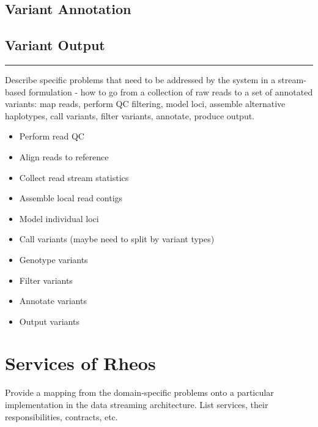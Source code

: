\subsection{Variant Annotation}

\subsection{Variant Output}

\hrule
Describe specific problems that need to be addressed by the system in a stream-based formulation - how to go from a collection of raw reads to a set of annotated variants: map reads, perform QC filtering, model loci, assemble alternative haplotypes, call variants, filter variants, annotate, produce output.  


\begin{itemize}
    \item Perform read QC
    \item Align reads to reference
    \item Collect read stream statistics
    \item Assemble local read contigs
    \item Model individual loci
    \item Call variants (maybe need to split by variant types)
    \item Genotype variants
    \item Filter variants
    \item Annotate variants
    \item Output variants
\end{itemize}



\section{Services of Rheos}

Provide a mapping from the domain-specific problems onto a particular implementation in the data streaming architecture. List services, their responsibilities, contracts, etc.

